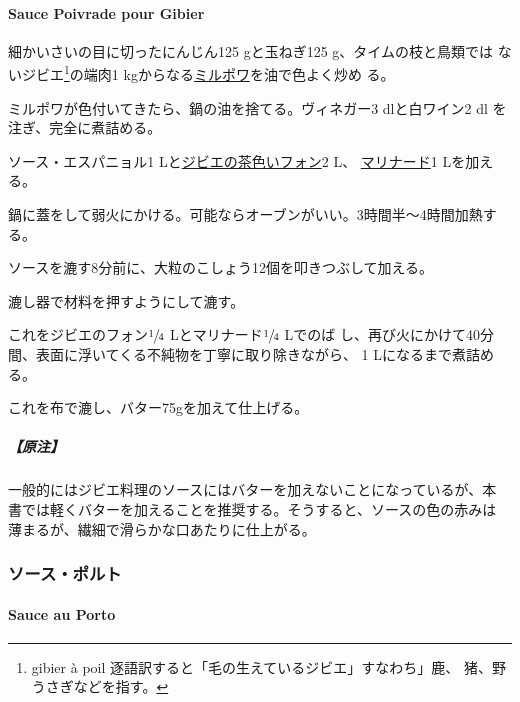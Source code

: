 \hypertarget{sauce-poivrade-pour-gibier}{%
\paragraph{Sauce Poivrade pour
Gibier}\label{sauce-poivrade-pour-gibier}}


細かいさいの目に切ったにんじん125 gと玉ねぎ125 g、タイムの枝と鳥類では
ないジビエ\footnote{gibier à poil
  逐語訳すると「毛の生えているジビエ」すなわち」鹿、
  猪、野うさぎなどを指す。}の端肉1
kgからなる\protect\hyperlink{mirepoix}{ミルポワ}を油で色よく炒め る。

ミルポワが色付いてきたら、鍋の油を捨てる。ヴィネガー3 dlと白ワイン2 dl
を注ぎ、完全に煮詰める。

ソース・エスパニョル1
Lと\protect\hyperlink{fonds-de-gibier}{ジビエの茶色いフォン}2 L、
\href{}{マリナード}1 Lを加える。

鍋に蓋をして弱火にかける。可能ならオーブンがいい。3時間半〜4時間加熱する。

ソースを漉す8分前に、大粒のこしょう12個を叩きつぶして加える。

漉し器で材料を押すようにして漉す。

これをジビエのフォン\(\sfrac{1}{4}\) Lとマリナード\(\sfrac{1}{4}\)
Lでのば
し、再び火にかけて40分間、表面に浮いてくる不純物を丁寧に取り除きながら、
1 Lになるまで煮詰める。

これを布で漉し、バター75gを加えて仕上げる。

\hypertarget{ux539fux6ce8-6}{%
\subparagraph{【原注】}\label{ux539fux6ce8-6}}

一般的にはジビエ料理のソースにはバターを加えないことになっているが、本
書では軽くバターを加えることを推奨する。そうすると、ソースの色の赤みは
薄まるが、繊細で滑らかな口あたりに仕上がる。

\maeaki

\hypertarget{ux30bdux30fcux30b9ux30ddux30ebux30c8}{%
\subsubsection{ソース・ポルト}\label{ux30bdux30fcux30b9ux30ddux30ebux30c8}}

\hypertarget{sauce-au-porto}{%
\paragraph{Sauce au Porto}\label{sauce-au-porto}}

